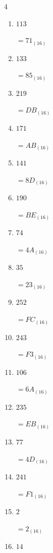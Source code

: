 \begin{multicols}{4}
\begin{enumerate}
        $=37_{(16)}$

  \item $113$

        $=71_{(16)}$

  \item $133$

        $=85_{(16)}$

  \item $219$

        $=DB_{(16)}$

  \item $171$

        $=AB_{(16)}$

  \item $141$

        $=8D_{(16)}$

  \item $190$

        $=BE_{(16)}$

  \item $74$

        $=4A_{(16)}$

  \item $35$

        $=23_{(16)}$

  \item $252$

        $=FC_{(16)}$

  \item $243$

        $=F3_{(16)}$

  \item $106$

        $=6A_{(16)}$

  \item $235$

        $=EB_{(16)}$

\columnbreak %

\resetques

  \item $77$

        $=4D_{(16)}$

  \item $241$

        $=F1_{(16)}$

  \item $2$

        $=2_{(16)}$

  \item $14$


\end{enumerate}
\end{multicols}
